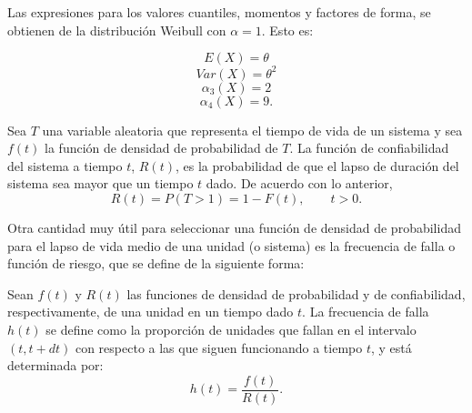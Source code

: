 Las expresiones para los valores cuantiles, momentos y factores de forma, se obtienen de la distribución Weibull con $\alpha=1$. Esto es:

\begin{tcolorbox}
    $$E(X)=\theta$$
    $$Var(X)=\theta^2$$
    $$\alpha_3(X)=2$$
    $$\alpha_4(X)=9.$$
\end{tcolorbox}

\begin{tcolorbox}
    \begin{def.}
	Sea $T$ una variable aleatoria que representa el tiempo de vida de un sistema y sea $f(t)$ la función de densidad de probabilidad de $T$. La función de confiabilidad del sistema a tiempo $t$, $R(t)$, es la probabilidad de que el lapso de duración del sistema sea mayor que un tiempo $t$ dado. De acuerdo con lo anterior,
	$$R(t)=P(T>1)=1-F(t),\qquad t>0.$$
    \end{def.}
\end{tcolorbox}

Otra cantidad muy útil para seleccionar una función de densidad de probabilidad para el lapso de vida medio de una unidad (o sistema) es la frecuencia de falla o función de riesgo, que se define de la siguiente forma:

\begin{tcolorbox}
    \begin{def.}
	Sean $f(t)$ y $R(t)$ las funciones de densidad de probabilidad y de confiabilidad, respectivamente, de una unidad en un tiempo dado $t$. La frecuencia de falla $h(t)$ se define como la proporción de unidades que fallan en el intervalo $(t,t+dt)$ con respecto a las que siguen funcionando a tiempo $t$, y está determinada por:
	$$h(t)=\dfrac{f(t)}{R(t)}.$$
    \end{def.}
\end{tcolorbox}





